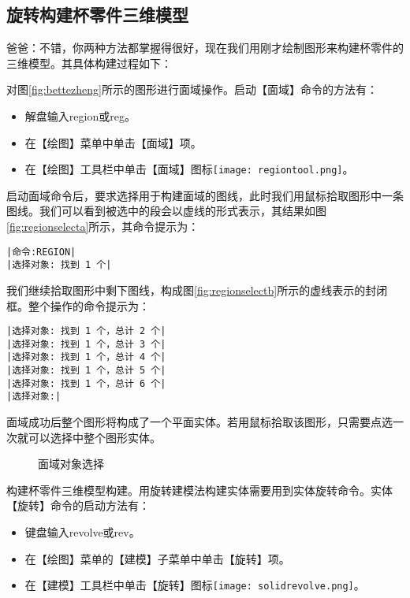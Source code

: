 \subsection{旋转构建杯零件三维模型}
爸爸：不错，你两种方法都掌握得很好，现在我们用刚才绘制图形来构建杯零件的三维模型。其具体构建过程如下：
\begin{procedure}
\item 对图\ref{fig:bettezheng}所示的图形进行面域操作。启动【面域】命令的方法有：
\begin{itemize}
\item 解盘输入region或reg。
\item 在【绘图】菜单中单击【面域】项。
\item 在【绘图】工具栏中单击【面域】图标\texttt{[image: regiontool.png]}。
\end{itemize}
启动面域命令后，要求选择用于构建面域的图线，此时我们用鼠标拾取图形中一条图线。我们可以看到被选中的段会以虚线的形式表示，其结果如图\ref{fig:regionselecta}所示，其命令提示为：
\begin{lstlisting}
|命令:REGION|
|选择对象: 找到 1 个|
\end{lstlisting}
我们继续拾取图形中剩下图线，构成图\ref{fig:regionselectb}所示的虚线表示的封闭框。整个操作的命令提示为：
\begin{lstlisting}
|选择对象: 找到 1 个，总计 2 个|
|选择对象: 找到 1 个，总计 3 个|
|选择对象: 找到 1 个，总计 4 个|
|选择对象: 找到 1 个，总计 5 个|
|选择对象: 找到 1 个，总计 6 个|
|选择对象:|
\end{lstlisting}
面域成功后整个图形将构成了一个平面实体。若用鼠标拾取该图形，只需要点选一次就可以选择中整个图形实体。
\begin{figure}[htbp]
\centering
{}\hspace{30pt}
\caption{面域对象选择}
\end{figure}
\item 构建杯零件三维模型构建。用旋转建模法构建实体需要用到实体旋转命令。实体【旋转】命令的启动方法有：
\begin{itemize}
\item 键盘输入revolve或rev。
\item 在【绘图】菜单的【建模】子菜单中单击【旋转】项。
\item 在【建模】工具栏中单击【旋转】图标\texttt{[image: solidrevolve.png]}。
\end{itemize}

\end{procedure}
